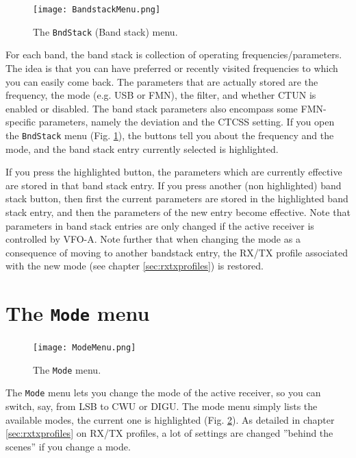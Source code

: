 \documentclass[12pt]{book}
\def\bltt#1{\texttt{\color{blue}#1}}
\begin{document}
\begin{figure}[ht!]
\center
\texttt{[image: BandstackMenu.png]}
\caption{The \bltt{BndStack} (Band stack) menu.}
\label{fig:BandstackMenu}
\end{figure}

For each band, the band stack is collection of operating frequencies/parameters. The idea is that
you can have preferred or recently visited frequencies to which you can easily come back.
The parameters that are actually stored are the frequency, the mode (e.g. USB or FMN),
the filter, and whether CTUN is enabled or disabled. The band stack parameters
also encompass some FMN-specific parameters,  namely the deviation and
the  CTCSS setting.
If you open the \bltt{BndStack} menu (Fig. \ref{fig:BandstackMenu}), the buttons
tell you about the frequency and the mode, and the band stack entry currently selected is highlighted.

If you press the highlighted button, the parameters which are currently effective are stored in that band stack
entry. If you press another (non highlighted) band stack button, then first the current
parameters are stored in the highlighted band stack entry, and then the parameters of the
new entry become effective. Note that parameters in band stack entries are only changed if the active
receiver is controlled by VFO-A. Note further that when changing the mode as a consequence of
moving to another bandstack entry, the RX/TX profile associated with the new mode (see chapter \ref{sec:rxtxprofiles})
is restored.

\section{The \texttt{Mode} menu}
\begin{figure}[ht]
\center
\texttt{[image: ModeMenu.png]}
\caption{The \bltt{Mode} menu.}
\label{fig:ModeMenu}
\end{figure}

The \bltt{Mode} menu lets you change the mode of the active receiver, so you can switch,
say, from LSB to CWU or DIGU. The mode menu simply lists the available modes, the current
one is highlighted (Fig. \ref{fig:ModeMenu}). As detailed in chapter \ref{sec:rxtxprofiles}
on RX/TX profiles,
a lot of settings are changed ''behind the scenes'' if you change a mode.

\end{document}
